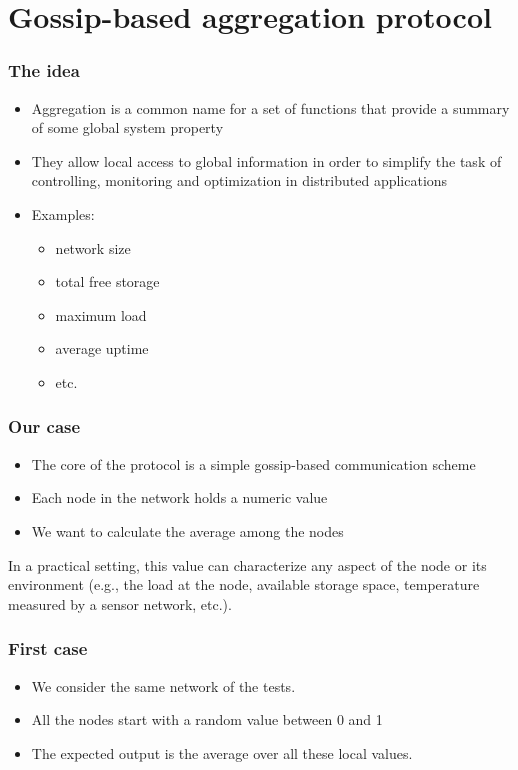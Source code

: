 \documentclass{beamer}
\begin{document}
\section{Gossip-based aggregation protocol}

\begin{frame}
\frametitle{The idea}

\begin{itemize}
  \item Aggregation is a common name for a set of functions that provide a summary of some global system property
  \item They allow local access to global information in order to simplify the task of controlling, monitoring and optimization in distributed applications
  \item Examples:
  \begin{itemize}
    \item network size
    \item total free storage
    \item maximum load
    \item average uptime
    \item etc.
  \end{itemize}
\end{itemize}

\end{frame}

\begin{frame}
\frametitle{Our case}

\begin{itemize}
  \item The core of the protocol is a simple gossip-based communication scheme
  \item Each node in the network holds a numeric value
  \item We want to calculate the average among the nodes
\end{itemize}

In a practical setting, this value can characterize any aspect of the node or its environment (e.g., the load at the node, available storage space, temperature measured by a sensor network, etc.).

\end{frame}

\begin{frame}
\frametitle{First case}

\begin{itemize}
  \item We consider the same network of the tests.
  \item All the nodes start with a random value between 0 and 1
  \item The expected output is the average over all these local values.
\end{itemize}
\end{frame}
\end{document}
